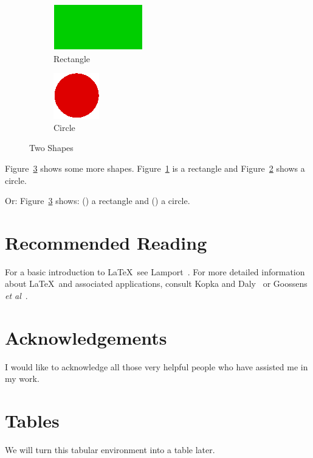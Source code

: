 \documentclass[12pt]{scrbook}
\begin{document}
\begin{figure}[hbtp]
 \begin{subfigure}[b]{0.5\linewidth}
   \centering
   \includegraphics{rectangle}
   \caption{Rectangle}\label{fig:rectangle}
 \end{subfigure}%
 \begin{subfigure}[b]{0.5\linewidth}
   \centering
   \includegraphics{circle}
   \caption{Circle}\label{fig:circle}
 \end{subfigure}%
\caption{Two Shapes}
\label{fig:shapes2}
\end{figure}

Figure~\ref{fig:shapes2} shows some more shapes.
Figure~\ref{fig:rectangle} is a rectangle and
Figure~\ref{fig:circle} shows a circle.

Or: Figure~\ref{fig:shapes2} shows: ()
a rectangle and () a circle.

\chapter{Recommended Reading}

For a basic introduction to \LaTeX\ see Lamport~\cite{lamport94}.
For more detailed information about \LaTeX\ and
associated applications, consult Kopka and Daly~\cite{kopka95}
or Goossens \emph{et al}~\cite{goossens94}.

\chapter*{Acknowledgements}

I would like to acknowledge all those
very helpful people who have assisted
me in my work.

\appendix
\chapter{Tables}

We will turn this tabular environment into a table later.
\end{document}
